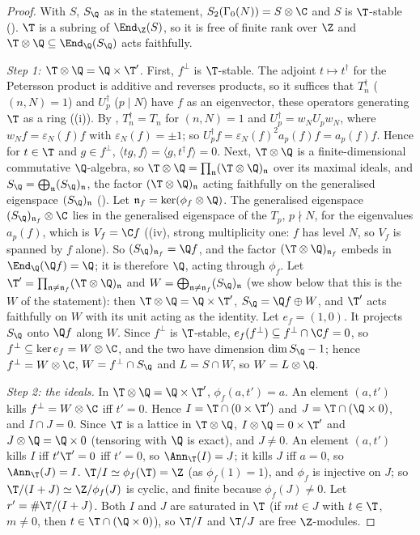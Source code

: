 \begin{proof}
With $S$, $S_\Q$ as in the statement, $S_2(\Gamma_0(N))=S\otimes\C$ and $S$ is $\T$-stable (). $\T$ is a subring of $\End_\Z(S)$, so it is
free of finite rank over $\Z$ and $\T\otimes\Q\subseteq\End_\Q(S_\Q)$ acts faithfully.

\emph{Step 1: $\T\otimes\Q=\Q\times\T'$.} First, $f^\perp$ is $\T$-stable. The adjoint $t\mapsto t^\dagger$ for the Petersson product is additive and reverses products, so
it suffices that $T_n^\dagger$ ($(n,N)=1$) and $U_p^\dagger$ ($p\mid N$) have $f$ as an eigenvector, these operators generating $\T$ as a ring
((i)). By , $T_n^\dagger=T_n$ for $(n,N)=1$ and $U_p^\dagger=w_NU_pw_N$, where $w_Nf=\varepsilon_N(f)f$ with $\varepsilon_N(f)=\pm1$;
so $U_p^\dagger f=\varepsilon_N(f)^2a_p(f)f=a_p(f)f$. Hence for $t\in\T$ and $g\in f^\perp$, $\langle tg,f\rangle=\langle g,t^\dagger f\rangle=0$.
Next, $\T\otimes\Q$ is a finite-dimensional commutative $\Q$-algebra, so $\T\otimes\Q=\prod_{\mathfrak n}(\T\otimes\Q)_{\mathfrak n}$ over its maximal ideals, and $S_\Q=\bigoplus_{\mathfrak n}(S_\Q)_{\mathfrak n}$,
the factor $(\T\otimes\Q)_{\mathfrak n}$ acting faithfully on the generalised eigenspace $(S_\Q)_{\mathfrak n}$ (). Let $\mathfrak n_f=\ker(\phi_f\otimes\Q)$. The generalised
eigenspace $(S_\Q)_{\mathfrak n_f}\otimes\C$ lies in the generalised eigenspace of the $T_p$, $p\nmid N$, for the eigenvalues $a_p(f)$, which is $V_f=\C f$
((iv), strong multiplicity one: $f$ has level $N$, so $V_f$ is spanned by $f$ alone). So $(S_\Q)_{\mathfrak n_f}=\Q f$, and the factor
$(\T\otimes\Q)_{\mathfrak n_f}$ embeds in $\End_\Q(\Q f)=\Q$; it is therefore $\Q$, acting through $\phi_f$. Let $\T'=\prod_{\mathfrak n\ne\mathfrak n_f}(\T\otimes\Q)_{\mathfrak n}$ and $W=\bigoplus_{\mathfrak n\ne\mathfrak n_f}(S_\Q)_{\mathfrak n}$ (we show below that this is the $W$ of the statement):
then $\T\otimes\Q=\Q\times\T'$, $S_\Q=\Q f\oplus W$, and $\T'$ acts faithfully on $W$ with its unit acting as the identity. Let $e_f=(1,0)$. It projects $S_\Q$ onto $\Q f$
along $W$. Since $f^\perp$ is $\T$-stable, $e_f(f^\perp)\subseteq f^\perp\cap\C f=0$, so $f^\perp\subseteq\ker e_f=W\otimes\C$, and the two have dimension $\dim S_\Q-1$; hence
$f^\perp=W\otimes\C$, $W=f^\perp\cap S_\Q$ and $L=S\cap W$, so $W=L\otimes\Q$.

\emph{Step 2: the ideals.} In $\T\otimes\Q=\Q\times\T'$, $\phi_f(a,t')=a$. An element $(a,t')$ kills $f^\perp=W\otimes\C$ iff $t'=0$. Hence $I=\T\cap(0\times\T')$ and $J=\T\cap(\Q\times0)$, and
$I\cap J=0$. Since $\T$ is a lattice in $\T\otimes\Q$, $I\otimes\Q=0\times\T'$ and $J\otimes\Q=\Q\times0$ (tensoring with $\Q$ is exact), and $J\ne0$. An element $(a,t')$ kills $I$ iff
$t'\T'=0$ iff $t'=0$, so $\Ann_\T(I)=J$; it kills $J$ iff $a=0$, so $\Ann_\T(J)=I$. $\T/I\simeq\phi_f(\T)=\Z$ (as $\phi_f(1)=1$), and $\phi_f$ is injective on $J$; so
$\T/(I+J)\simeq\Z/\phi_f(J)$ is cyclic, and finite because $\phi_f(J)\ne0$. Let $r'=\#\T/(I+J)$. Both $I$ and $J$ are saturated in $\T$ (if $mt\in J$ with $t\in\T$, $m\ne0$, then $t\in\T\cap(\Q\times0)$),
so $\T/I$ and $\T/J$ are free $\Z$-modules.


\end{proof}
